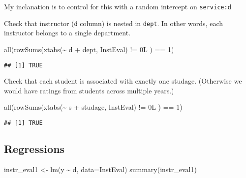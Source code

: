 \documentclass[
]{article}
\newenvironment{Shaded}{\begin{snugshade}}{\end{snugshade}}
\newcommand{\AttributeTok}[1]{\textcolor[rgb]{0.77,0.63,0.00}{#1}}
\newcommand{\DecValTok}[1]{\textcolor[rgb]{0.00,0.00,0.81}{#1}}
\newcommand{\FunctionTok}[1]{\textcolor[rgb]{0.00,0.00,0.00}{#1}}
\newcommand{\NormalTok}[1]{#1}
\newcommand{\OtherTok}[1]{\textcolor[rgb]{0.56,0.35,0.01}{#1}}
\newcommand{\SpecialCharTok}[1]{\textcolor[rgb]{0.00,0.00,0.00}{#1}}
\begin{document}
My inclanation is to control for this with a random intercept on
\texttt{service:d}

Check that instructor (\texttt{d} column) is nested in \texttt{dept}. In
other words, each instructor belongs to a single department.

\begin{Shaded}
\begin{Highlighting}[]
\FunctionTok{all}\NormalTok{(}\FunctionTok{rowSums}\NormalTok{(}\FunctionTok{xtabs}\NormalTok{(}\SpecialCharTok{\textasciitilde{}}\NormalTok{ d }\SpecialCharTok{+}\NormalTok{ dept, InstEval) }\SpecialCharTok{!=}\NormalTok{ 0L ) }\SpecialCharTok{==} \DecValTok{1}\NormalTok{)}
\end{Highlighting}
\end{Shaded}

\begin{verbatim}
## [1] TRUE
\end{verbatim}

Check that each student is associated with exactly one studage.
(Otherwise we would have ratings from students across multiple years.)

\begin{Shaded}
\begin{Highlighting}[]
\FunctionTok{all}\NormalTok{(}\FunctionTok{rowSums}\NormalTok{(}\FunctionTok{xtabs}\NormalTok{(}\SpecialCharTok{\textasciitilde{}}\NormalTok{ s }\SpecialCharTok{+}\NormalTok{ studage, InstEval) }\SpecialCharTok{!=}\NormalTok{ 0L ) }\SpecialCharTok{==} \DecValTok{1}\NormalTok{)}
\end{Highlighting}
\end{Shaded}

\begin{verbatim}
## [1] TRUE
\end{verbatim}

\hypertarget{regressions}{%
\subsection{Regressions}\label{regressions}}

\begin{Shaded}
\begin{Highlighting}[]
\NormalTok{instr\_eval1 }\OtherTok{\textless{}{-}} \FunctionTok{lm}\NormalTok{(y }\SpecialCharTok{\textasciitilde{}}\NormalTok{ d, }\AttributeTok{data=}\NormalTok{InstEval)}
\FunctionTok{summary}\NormalTok{(instr\_eval1)}
\end{Highlighting}
\end{Shaded}
\end{document}
